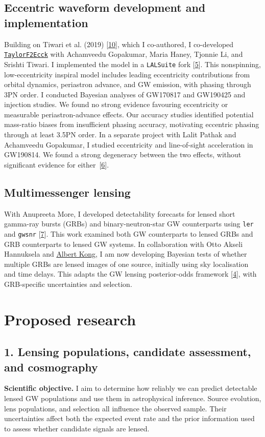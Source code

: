 \documentclass[11pt]{article}
\begin{document}
\subsection*{Eccentric waveform development and implementation}
Building on Tiwari et al. (2019) [\hyperlink{ref10}{10}], which I co-authored, I co-developed \href{https://arxiv.org/abs/2508.12697}{\texttt{TaylorF2Ecck}} with Achamveedu Gopakumar, Maria Haney, Tjonnie Li, and Srishti Tiwari. I implemented the model in a \texttt{LALSuite} fork [\hyperlink{ref5}{5}]. This nonspinning, low-eccentricity inspiral model includes leading eccentricity contributions from orbital dynamics, periastron advance, and GW emission, with phasing through 3PN order. I conducted Bayesian analyses of GW170817 and GW190425 and injection studies. We found no strong evidence favouring eccentricity or measurable periastron-advance effects. Our accuracy studies identified potential mass-ratio biases from insufficient phasing accuracy, motivating eccentric phasing through at least 3.5PN order. In a separate project with Lalit Pathak and Achamveedu Gopakumar, I studied eccentricity and line-of-sight acceleration in GW190814. We found a strong degeneracy between the two effects, without significant evidence for either~[\hyperlink{ref6}{6}].

\subsection*{Multimessenger lensing}
With Anupreeta More, I developed detectability forecasts for lensed short gamma-ray bursts (GRBs) and binary-neutron-star GW counterparts using \texttt{ler} and \texttt{gwsnr} [\hyperlink{ref7}{7}]. This work examined both GW counterparts to lensed GRBs and GRB counterparts to lensed GW systems. In collaboration with Otto Akseli Hannuksela and \href{https://iphd.site.nthu.edu.tw/p/406-1222-87294,r5205.php?Lang=en}{Albert Kong}, I am now developing Bayesian tests of whether multiple GRBs are lensed images of one source, initially using sky localisation and time delays. This adapts the GW lensing posterior-odds framework [\hyperlink{ref4}{4}], with GRB-specific uncertainties and selection.

\newpage
\section*{Proposed research}
\subsection*{1. Lensing populations, candidate assessment, and cosmography}
\textbf{Scientific objective.} I aim to determine how reliably we can predict detectable lensed GW populations and use them in astrophysical inference. Source evolution, lens populations, and selection all influence the observed sample. Their uncertainties affect both the expected event rate and the prior information used to assess whether candidate signals are lensed.
\end{document}
